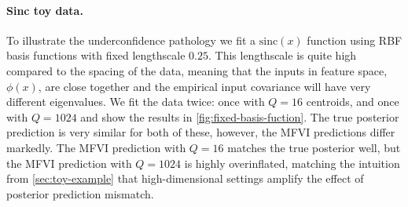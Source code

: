 \documentclass{article}
\theoremstyle{plain}
\theoremstyle{definition}
\theoremstyle{remark}
\theoremstyle{plain}
\begin{document}
\paragraph{Sinc toy data.} To illustrate the underconfidence pathology we fit a $\text{sinc}(x)$ function using RBF basis functions with fixed lengthscale $0.25$. This lengthscale is quite high compared to the spacing of the data, meaning that the inputs in feature space, $\phi(x)$,  are close together and the empirical input covariance will have very different eigenvalues. We fit the data twice: once with $Q=16$ centroids, and once with $Q=1024$ and show the results in \cref{fig:fixed-basis-fuction}. The true posterior prediction is very similar for both of these, however, the MFVI predictions differ markedly. The MFVI prediction with $Q=16$ matches the true posterior well, but the MFVI prediction with $Q=1024$ is highly overinflated, matching the intuition from \cref{sec:toy-example} that high-dimensional settings amplify the effect of posterior prediction mismatch. 

\end{document}
